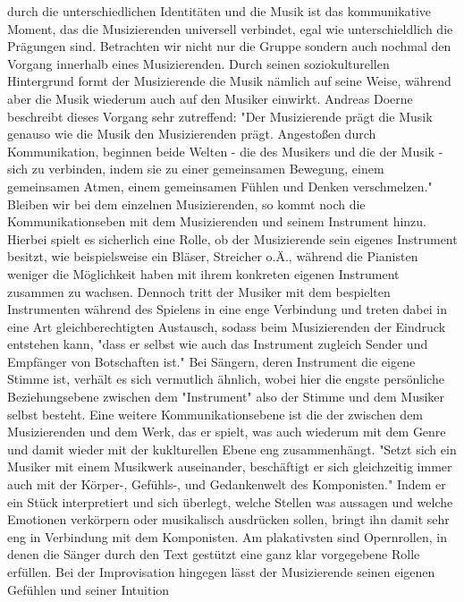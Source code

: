 durch die unterschiedlichen Identitäten und die Musik ist das kommunikative
Moment, das die Musizierenden universell verbindet, egal wie unterschieldlich
die Prägungen sind. Betrachten wir nicht nur die Gruppe sondern auch nochmal den
Vorgang innerhalb eines Musizierenden. Durch seinen soziokulturellen Hintergrund
formt der Musizierende die Musik nämlich auf seine Weise, während aber die Musik
wiederum auch auf den Musiker einwirkt. Andreas Doerne beschreibt dieses Vorgang
sehr zutreffend: "Der Musizierende prägt die Musik genauso wie die Musik den
Musizierenden prägt. Angestoßen durch Kommunikation, beginnen beide Welten - die
des Musikers und die der Musik - sich zu verbinden, indem sie zu einer
gemeinsamen Bewegung, einem gemeinsamen Atmen, einem gemeinsamen Fühlen und
Denken verschmelzen." \autocite[60]{doerne:umfassend_musizieren} Bleiben wir bei
dem einzelnen Musizierenden, so kommt noch die Kommunikationseben mit dem
Musizierenden und seinem Instrument hinzu. Hierbei spielt es sicherlich eine
Rolle, ob der Musizierende sein eigenes Instrument besitzt, wie beispielsweise
ein Bläser, Streicher o.Ä., während die Pianisten weniger die Möglichkeit haben
mit ihrem konkreten eigenen Instrument zusammen zu wachsen. Dennoch tritt der
Musiker mit dem bespielten Instrumenten während des Spielens in eine enge
Verbindung und treten dabei in eine Art gleichberechtigten Austausch, sodass
beim Musizierenden der Eindruck entstehen kann, "dass er selbst wie auch das
Instrument zugleich Sender und Empfänger von Botschaften ist."
\autocite[59]{doerne:umfassend_musizieren} Bei Sängern, deren Instrument die
eigene Stimme ist, verhält es sich vermutlich ähnlich, wobei hier die engste
persönliche Beziehungsebene zwischen dem "Instrument" also der Stimme und dem
Musiker selbst besteht. Eine weitere Kommunikationsebene ist die der zwischen
dem Musizierenden und dem Werk, das er spielt, was auch wiederum mit dem Genre
und damit wieder mit der kuklturellen Ebene eng zusammenhängt. "Setzt sich ein
Musiker mit einem Musikwerk auseinander, beschäftigt er sich gleichzeitig immer
auch mit der Körper-, Gefühls-, und Gedankenwelt des Komponisten."
\autocite[59]{doerne:umfassend_musizieren} Indem er ein Stück interpretiert und
sich überlegt, welche Stellen was aussagen und welche Emotionen verkörpern oder
musikalisch ausdrücken sollen, bringt ihn damit sehr eng in Verbindung mit dem
Komponisten. Am plakativsten sind Opernrollen, in denen die Sänger durch den
Text gestützt eine ganz klar vorgegebene Rolle erfüllen. Bei der Improvisation
hingegen lässt der Musizierende seinen eigenen Gefühlen und seiner Intuition
